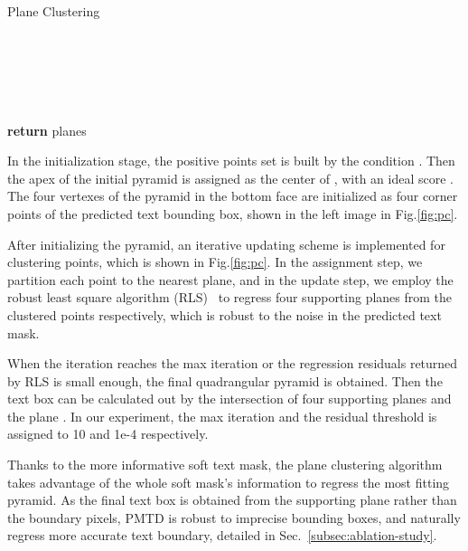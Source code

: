 \documentclass[10pt,twocolumn,letterpaper]{article}
\begin{document}
\renewcommand{\algorithmicrequire}{~~~~\textbf{input:}}
\renewcommand{\algorithmicensure}{~~~~\textbf{output:}}
\begin{algorithm}
    \caption{Plane Clustering}
    \label{alg1:plane-clustering}
    \begin{algorithmic}
        \Require \\
        ~~ \\
        ~~
        \Ensure \\
        ~~ \\
        ~~ \\
        \State 
        \State 
        \State 
        \State 
        \While{}
        \State 
        \For{}
        \State 
        \State 
        \EndFor
        \State 
        \EndWhile
        \State \textbf{return} planes
        \EndFunction
    \end{algorithmic}
\end{algorithm}

In the initialization stage, the positive points set  is built by the condition . Then the apex of the initial pyramid is assigned as the center of , with an ideal score . The four vertexes of the pyramid in the bottom face are initialized as four corner points of the predicted text bounding box, shown in the left image in Fig.\ref{fig:pc}.

After initializing the pyramid, an iterative updating scheme is implemented for clustering points, which is shown in Fig.\ref{fig:pc}. In the assignment step, we partition each point to the nearest plane, and in the update step, we employ the robust least square algorithm (RLS)~\cite{holland1977robust} to regress four supporting planes from the clustered points respectively, which is robust to the noise in the predicted text mask.

When the iteration reaches the max iteration or the regression residuals returned by RLS is small enough, the final quadrangular pyramid is obtained. Then the text box can be calculated out by the intersection of four supporting planes and the plane . In our experiment, the max iteration and the residual threshold is assigned to 10 and 1e-4 respectively.

Thanks to the more informative soft text mask, the plane clustering algorithm takes advantage of the whole soft mask's information to regress the most fitting pyramid. As the final text box is obtained from the supporting plane rather than the boundary pixels, PMTD is robust to imprecise bounding boxes, and naturally regress more accurate text boundary, detailed in Sec.~\ref{subsec:ablation-study}.
\end{document}
